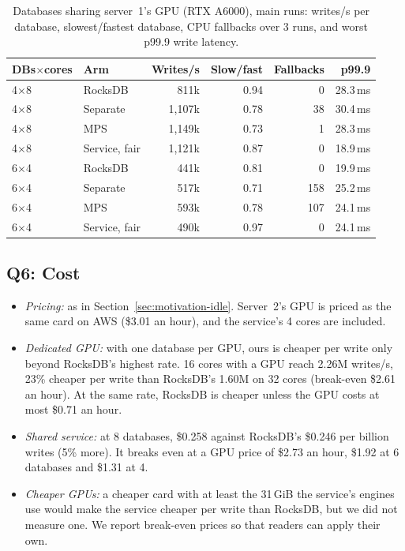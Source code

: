 \documentclass[sigconf, nonacm]{acmart}
\begin{document}
\begin{table}[t]
  \caption{Databases sharing server~1's GPU (RTX A6000), main runs: writes/s per database,
  slowest/fastest database, CPU fallbacks over 3 runs, and worst p99.9 write latency.}
  \label{tab:local}
  \small
  \setlength{\tabcolsep}{3pt}
  \begin{tabular}{llrrrr}
    \toprule
    DBs$\times$cores & Arm & Writes/s & Slow/fast & Fallbacks & p99.9 \\
    \midrule
    4$\times$8 & RocksDB       &   811k & 0.94 &   0 & 28.3\,ms \\
    4$\times$8 & Separate      & 1{,}107k & 0.78 &  38 & 30.4\,ms \\
    4$\times$8 & MPS           & 1{,}149k & 0.73 &   1 & 28.3\,ms \\
    4$\times$8 & Service, fair & 1{,}121k & 0.87 &   0 & 18.9\,ms \\
    6$\times$4 & RocksDB       &   441k & 0.81 &   0 & 19.9\,ms \\
    6$\times$4 & Separate      &   517k & 0.71 & 158 & 25.2\,ms \\
    6$\times$4 & MPS           &   593k & 0.78 & 107 & 24.1\,ms \\
    6$\times$4 & Service, fair &   490k & 0.97 &   0 & 24.1\,ms \\
    \bottomrule
  \end{tabular}
\end{table}

\subsection{Q6: Cost}
\label{sec:eval-cost}
\begin{itemize}
  \item \emph{Pricing:} as in Section~\ref{sec:motivation-idle}. Server~2's GPU is priced as
        the same card on AWS (\$3.01 an hour), and the service's 4 cores are included.
  \item \emph{Dedicated GPU:} with one database per GPU, ours is cheaper per write only beyond
        RocksDB's highest rate. 16 cores with a GPU reach 2.26M writes/s, 23\% cheaper per
        write than RocksDB's 1.60M on 32 cores (break-even \$2.61 an hour). At the same rate,
        RocksDB is cheaper unless the GPU costs at most \$0.71 an hour.
  \item \emph{Shared service:} at 8 databases, \$0.258 against RocksDB's \$0.246 per billion
        writes (5\% more). It breaks even at a GPU price of \$2.73 an hour, \$1.92 at 6
        databases and \$1.31 at 4.
  \item \emph{Cheaper GPUs:} a cheaper card with at least the 31\,GiB the service's engines
        use would make the service cheaper per write than RocksDB, but we did not measure one.
        We report break-even prices so that readers can apply their own.
\end{itemize}
\end{document}
